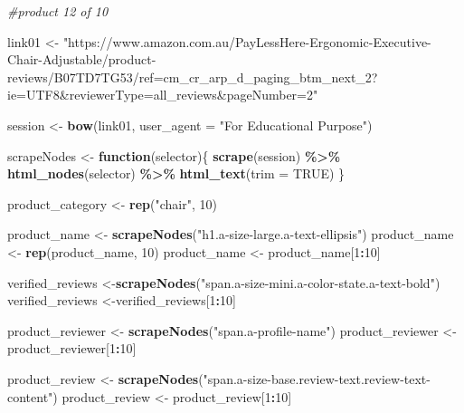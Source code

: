 \documentclass[
]{article}
\newenvironment{Shaded}{\begin{snugshade}}{\end{snugshade}}
\newcommand{\AttributeTok}[1]{\textcolor[rgb]{0.13,0.29,0.53}{#1}}
\newcommand{\CommentTok}[1]{\textcolor[rgb]{0.56,0.35,0.01}{\textit{#1}}}
\newcommand{\ConstantTok}[1]{\textcolor[rgb]{0.56,0.35,0.01}{#1}}
\newcommand{\ControlFlowTok}[1]{\textcolor[rgb]{0.13,0.29,0.53}{\textbf{#1}}}
\newcommand{\DecValTok}[1]{\textcolor[rgb]{0.00,0.00,0.81}{#1}}
\newcommand{\FunctionTok}[1]{\textcolor[rgb]{0.13,0.29,0.53}{\textbf{#1}}}
\newcommand{\NormalTok}[1]{#1}
\newcommand{\OtherTok}[1]{\textcolor[rgb]{0.56,0.35,0.01}{#1}}
\newcommand{\SpecialCharTok}[1]{\textcolor[rgb]{0.81,0.36,0.00}{\textbf{#1}}}
\newcommand{\StringTok}[1]{\textcolor[rgb]{0.31,0.60,0.02}{#1}}
\begin{document}
\begin{Shaded}
\begin{Highlighting}[]
\CommentTok{\#product 12 of 10}

\NormalTok{link01 }\OtherTok{\textless{}{-}} \StringTok{"https://www.amazon.com.au/PayLessHere{-}Ergonomic{-}Executive{-}Chair{-}Adjustable/product{-}reviews/B07TD7TG53/ref=cm\_cr\_arp\_d\_paging\_btm\_next\_2?ie=UTF8\&reviewerType=all\_reviews\&pageNumber=2"}


\NormalTok{  session }\OtherTok{\textless{}{-}} \FunctionTok{bow}\NormalTok{(link01,}
               \AttributeTok{user\_agent =} \StringTok{"For Educational Purpose"}\NormalTok{)}

\NormalTok{  scrapeNodes }\OtherTok{\textless{}{-}} \ControlFlowTok{function}\NormalTok{(selector)\{}
    \FunctionTok{scrape}\NormalTok{(session) }\SpecialCharTok{\%\textgreater{}\%}
      \FunctionTok{html\_nodes}\NormalTok{(selector) }\SpecialCharTok{\%\textgreater{}\%}
      \FunctionTok{html\_text}\NormalTok{(}\AttributeTok{trim =} \ConstantTok{TRUE}\NormalTok{)}
\NormalTok{  \}}

\NormalTok{  product\_category }\OtherTok{\textless{}{-}} \FunctionTok{rep}\NormalTok{(}\StringTok{"chair"}\NormalTok{, }\DecValTok{10}\NormalTok{)}

\NormalTok{  product\_name }\OtherTok{\textless{}{-}} \FunctionTok{scrapeNodes}\NormalTok{(}\StringTok{"h1.a{-}size{-}large.a{-}text{-}ellipsis"}\NormalTok{)}
\NormalTok{  product\_name }\OtherTok{\textless{}{-}} \FunctionTok{rep}\NormalTok{(product\_name, }\DecValTok{10}\NormalTok{)}
\NormalTok{  product\_name }\OtherTok{\textless{}{-}}\NormalTok{ product\_name[}\DecValTok{1}\SpecialCharTok{:}\DecValTok{10}\NormalTok{]}
  
\NormalTok{  verified\_reviews }\OtherTok{\textless{}{-}}\FunctionTok{scrapeNodes}\NormalTok{(}\StringTok{"span.a{-}size{-}mini.a{-}color{-}state.a{-}text{-}bold"}\NormalTok{)}
\NormalTok{  verified\_reviews }\OtherTok{\textless{}{-}}\NormalTok{verified\_reviews[}\DecValTok{1}\SpecialCharTok{:}\DecValTok{10}\NormalTok{]}
  
\NormalTok{  product\_reviewer }\OtherTok{\textless{}{-}} \FunctionTok{scrapeNodes}\NormalTok{(}\StringTok{"span.a{-}profile{-}name"}\NormalTok{)}
\NormalTok{  product\_reviewer }\OtherTok{\textless{}{-}}\NormalTok{ product\_reviewer[}\DecValTok{1}\SpecialCharTok{:}\DecValTok{10}\NormalTok{]}
  
\NormalTok{  product\_review }\OtherTok{\textless{}{-}} \FunctionTok{scrapeNodes}\NormalTok{(}\StringTok{"span.a{-}size{-}base.review{-}text.review{-}text{-}content"}\NormalTok{)}
\NormalTok{  product\_review }\OtherTok{\textless{}{-}}\NormalTok{ product\_review[}\DecValTok{1}\SpecialCharTok{:}\DecValTok{10}\NormalTok{]}
  

\end{Highlighting}
\end{Shaded}
\end{document}
